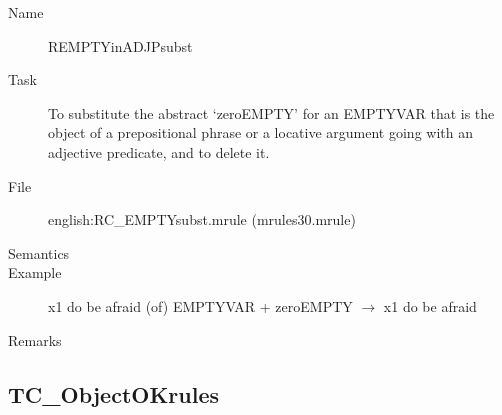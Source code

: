 \begin{description}
\vspace{1 cm}
\begin{description}
\item[Name] REMPTYinADJPsubst
\item[Task] To substitute the abstract `zeroEMPTY' for an EMPTYVAR that is the 
object of a prepositional phrase or a 
locative argument going with an adjective predicate, and to delete it.
\item[File] english:RC\_EMPTYsubst.mrule (mrules30.mrule)
\item[Semantics]
\item[Example] x1 do be afraid (of) EMPTYVAR + zeroEMPTY $\rightarrow$ x1 do 
be afraid 
\item[Remarks] 
\end{description}

\end{description}

\newpage
\subsection{TC\_ObjectOKrules}

